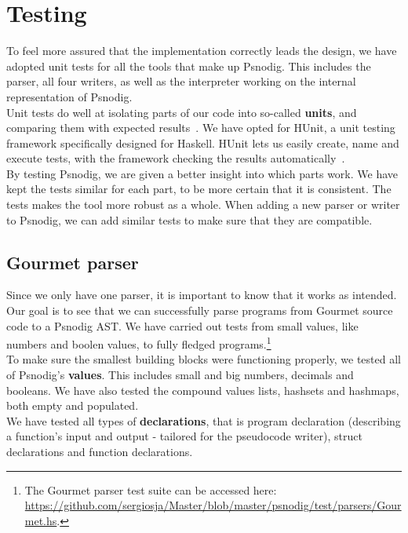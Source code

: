 \section{Testing}

To feel more assured that the implementation correctly leads the design, we have adopted unit tests for all the tools that make up Psnodig. This includes the parser, all four writers, as well as the interpreter working on the internal representation of Psnodig. \\

Unit tests do well at isolating parts of our code into so-called \textbf{units}, and comparing them with expected results~\cite{whatIsUnitTesting}. We have opted for HUnit, a unit testing framework specifically designed for Haskell. HUnit lets us easily create, name and execute tests, with the framework checking the results automatically~\cite{hunit}. \\

By testing Psnodig, we are given a better insight into which parts work. We have kept the tests similar for each part, to be more certain that it is consistent. The tests makes the tool more robust as a whole. When adding a new parser or writer to Psnodig, we can add similar tests to make sure that they are compatible.

\subsection{Gourmet parser}

Since we only have one parser, it is important to know that it works as intended. Our goal is to see that we can successfully parse programs from Gourmet source code to a Psnodig AST. We have carried out tests from small values, like numbers and boolen values, to fully fledged programs.\footnote{The Gourmet parser test suite can be accessed here: \url{https://github.com/sergiosja/Master/blob/master/psnodig/test/parsers/Gourmet.hs}.} \\

To make sure the smallest building blocks were functioning properly, we tested all of Psnodig's \textbf{values}. This includes small and big numbers, decimals and booleans. We have also tested the compound values lists, hashsets and hashmaps, both empty and populated. \\

We have tested all types of \textbf{declarations}, that is program declaration (describing a function's input and output - tailored for the pseudocode writer), struct declarations and function declarations. \\

